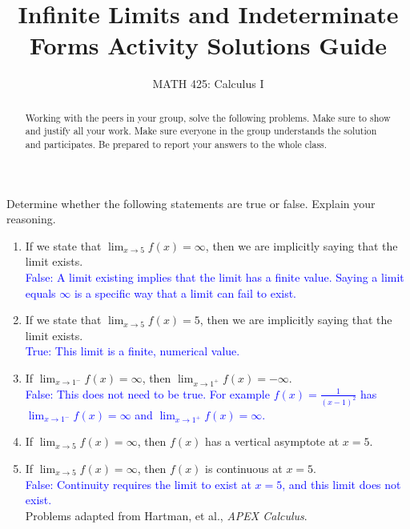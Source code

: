 \documentclass{ximera}
\title{Infinite Limits and Indeterminate Forms Activity Solutions Guide}
\author{MATH 425: Calculus I}
\begin{document}
\begin{abstract}
    Working with the peers in your group, solve the following problems. Make sure to show and justify all your work. Make sure everyone in the group understands the solution and participates. Be prepared to report your answers to the whole class. 
\end{abstract}
\maketitle

\begin{exercise}
    Determine whether the following statements are true or false.  Explain your reasoning.
    \begin{enumerate}
        \item If we state that $\lim_{x\rightarrow 5}f(x)=\infty$, then we are implicitly saying that the limit exists.\\
        \textcolor{blue}{False: A limit existing implies that the limit has a finite value.  Saying a limit equals $\infty$ is a specific way that a limit can fail to exist.}
        \item If we state that $\lim_{x\rightarrow 5}f(x)=5$, then we are implicitly saying that the limit exists.\\
        \textcolor{blue}{True: This limit is a finite, numerical value.}
        \item If $\lim_{x\rightarrow 1^-}f(x)=\infty$, then $\lim_{x\rightarrow 1^+}f(x)=-\infty$.\\
        \textcolor{blue}{False: This does not need to be true.  For example $f(x)=\frac{1}{(x-1)^2}$ has $\lim_{x\rightarrow 1^-}f(x)=\infty$ and $\lim_{x\rightarrow 1^+}f(x)=\infty$.}
        \item If $\lim_{x\rightarrow 5}f(x)=\infty$, then $f(x)$ has a vertical asymptote at $x=5$.
        \item If $\lim_{x\rightarrow 5}f(x)=\infty$, then $f(x)$ is continuous at $x=5$.\\
        \textcolor{blue}{False: Continuity requires the limit to exist at $x=5$, and this limit does not exist.}\\
         Problems adapted from Hartman, et al., \textit{APEX Calculus}.
    \end{enumerate} 
\end{exercise}
\end{document}
